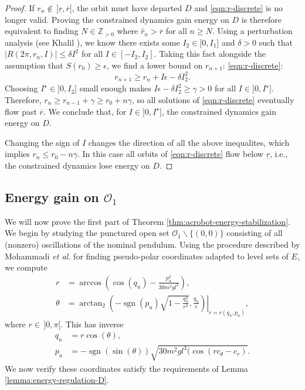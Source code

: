 \documentclass[journal,twoside,web]{ieeecolor}
\DeclareMathOperator{\Sign}{sgn}
\newcommand*{\sign}[1]{\Sign\left(#1\right)}
\newcommand*{\etal}{\MakeLowercase{\textit{et al.}}}
\begin{document}
{\begin{proof}
    If \(r_n \not\in \, ]\underline{r},\overline{r}[\), the orbit must have
    departed \(D\) and \eqref{eqn:r-discrete} is no longer valid.
    Proving the constrained dynamics gain energy on \(D\) is therefore
    equivalent to finding \(N \in \mathbb{Z}_{> 0}\) where 
    \(\hat{r}_{n} > \overline{r}\) for all \(n \geq N\).
    Using a perturbation analysis (see Khalil 
    \cite[Theorem 10.1]{khalil_nonlinear}),
    we know there exists some \(I_2 \in ]0,I_1]\) and \(\delta > 0\)
    such that \(\left|R(2\pi,r_n,I)\right| \leq \delta I^2\) for all 
    \(I \in [-I_2,I_2]\).
    Taking this fact alongside the assumption that \(S(r_0) \geq \epsilon\),
    we find a lower bound on \(r_{n+1}\):
    \eqref{eqn:r-discrete}:
    \[
        r_{n+1} \geq r_n + I\epsilon - \delta I_2^2
        .
    \]
    Choosing \(I^\star \in ]0,I_2]\) small enough makes 
    \(I\epsilon - \delta I_2^2 \geq \gamma > 0\) for all \(I \in ]0,I^\star]\).
    Therefore, \(r_{n} \geq r_{n-1} + \gamma \geq r_0 + n\gamma\), 
    so all solutions of \eqref{eqn:r-discrete} eventually flow past
    \(\overline{r}\).
    We conclude that, for \(I \in ]0, I^\star]\), the constrained dynamics gain
    energy on \(D\).

    Changing the sign of \(I\) changes the direction of all the
    above inequalites, which implies \(r_{n} \leq r_0 - n\gamma\). 
    In this case all orbits of \eqref{eqn:r-discrete} flow below
    \(\underline{r}\), i.e., the constrained dynamics lose energy on \(D\).
\end{proof}

\subsection{Energy gain on \(\mathcal{O}_1\)}
We will now prove the first part of Theorem
\ref{thm:acrobot-energy-stabilization}.
We begin by studying the punctured open set
\(\mathcal{O}_1 \backslash \{(0,0)\}\) consisting of all (nonzero) oscillations
of the nominal pendulum.
Using the procedure described by Mohammadi \etal 
\cite{dynamic_vhcs_stabilize_closed_orbits} for finding pseudo-polar
coordinates adapted to level sets of \(E\), we compute
\begin{align}
    \label{eqn:r-osc}
    r &= \arccos\left(\cos(q_u) - \frac{p_u^2}{30m^2gl^3}\right)
    , \\
    \label{eqn:theta-osc}
    \theta &=
    \left.\arctan_2\left(-\sign{p_u}\sqrt{1-\frac{q_u^2}{r^2}},\frac{q_u}{r}\right)
    \right|_{r = r(q_u,p_u)}
    ,
\end{align}
where \(r \in \, ]0,\pi[\).
This has inverse
\begin{align*}
    q_u &= r\cos(\theta)
    , \\
    p_u &= -\sign{\sin(\theta)}
    \sqrt{30m^2gl^3(\cos(rc_\theta - c_r)}
    .
\end{align*}
We now verify these coordinates satisfy the requirements of 
Lemma \ref{lemma:energy-regulation-D}.

}
\end{document}
